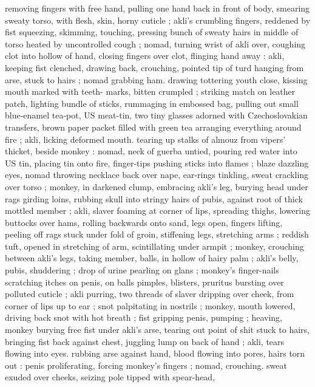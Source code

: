 removing fingers with free hand, pulling one hand back in front of 
body, smearing sweaty torso, with flesh, skin, horny cuticle ; akli's 
crumbling fingers, reddened by fist squeezing, skimming, touching, 
pressing bunch of sweaty hairs in middle of torso heated by 
uncontrolled cough ; nomad, turning wrist of akli over, coughing clot 
into hollow of hand, closing fingers over clot, flinging hand away : 
akli, keeping fist clenched, drawing back, crouching, pointed tip of 
turd hanging from arse, stuck to hairs ; nomad grabbing ham. 
drawing tottering youth close, kissing mouth marked with teeth- 
marks, bitten crumpled ; striking match on leather patch, lighting 
bundle of sticks, rummaging in embossed bag, pulling out small 
blue-enamel tea-pot, US meat-tin, two tiny glasses adorned with 
Czechoslovakian transfers, brown paper packet filled with green tea 
{\col} arranging everything around fire ; akli, licking deformed mouth. 
tearing up stalks of almouz from vipers' thicket, beside monkey : 
nomad, neck of guerba untied, pouring red water into US tin, placing 
tin onto fire, finger-tips pushing sticks into flames ; blaze dazzling 
eyes, nomad throwing necklace back over nape, ear-rings tinkling, 
sweat crackling over torso ; monkey, in darkened clump, embracing 
akli's leg, burying head under rags girding loins, rubbing skull into 
stringy hairs of pubis, against root of thick mottled member ; akli, 
slaver foaming at corner of lips, spreading thighs, lowering buttocks 
over hams, rolling backwards onto sand, legs open, fingers lifting, 
peeling off rags stuck under fold of groin, stiffening legs, stretching 
arms ; reddish tuft, opened in stretching of arm, scintillating under 
armpit ; monkey, crouching between akli's legs, taking member, balls, 
in hollow of hairy palm ; akli's belly, pubis, shuddering ; drop of 
urine pearling on glans ; monkey's finger-nails scratching itches on 
penis, on balls {\col} pimples, blisters, pruritus bursting over polluted 
cuticle ; akli purring, two threads of slaver dripping over cheek, from 
corner of lips up to ear ; snot palpitating in nostrils ; monkey, mouth 
lowered, driving back snot with hot breath ; fist gripping penis, 
pumping ; heaving, monkey burying free fist under akli's arse, 
tearing out point of shit stuck to hairs, bringing fist back against 
chest, juggling lump on back of hand ; akli, tears flowing into eyes. 
rubbing arse against hand, blood flowing into pores, hairs torn out : 
penis proliferating, forcing monkey's fingers ; nomad, crouching. 
sweat exuded over cheeks, seizing pole tipped with spear-head, 
